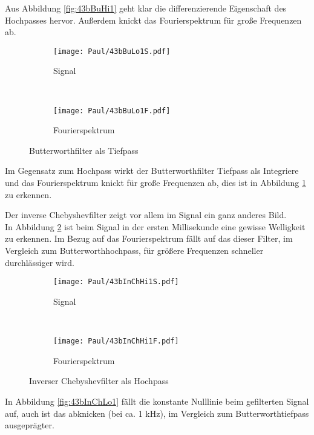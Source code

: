 Aus Abbildung \ref{fig:43bBuHi1} geht klar die differenzierende Eigenschaft des Hochpasses hervor. Außerdem knickt das Fourierspektrum für große Frequenzen ab.\\

\begin{figure}[h]
    \centering
    \begin{subfigure}{0.9\textwidth}
        \centering
        \texttt{[image: Paul/43bBuLo1S.pdf]}
        \caption{Signal}
    \end{subfigure}
    \\
    \begin{subfigure}{0.9\textwidth}
        \centering
        \texttt{[image: Paul/43bBuLo1F.pdf]}
        \caption{Fourierspektrum}
    \end{subfigure}
    \caption{Butterworthfilter als Tiefpass}
    \label{fig:43BuLo1}
\end{figure}

Im Gegensatz zum Hochpass wirkt der Butterworthfilter Tiefpass als Integriere und das Fourierspektrum knickt für große Frequenzen ab, dies ist in Abbildung \ref{fig:43BuLo1} zu erkennen.


\newpage
Der inverse Chebyshevfilter zeigt vor allem im Signal ein ganz anderes Bild.\\
In Abbildung \ref{fig:43bInChHi1} ist beim Signal in der ersten Millisekunde eine gewisse Welligkeit zu erkennen. Im Bezug auf das Fourierspektrum fällt auf das dieser Filter, im Vergleich zum Butterworthhochpass, für größere Frequenzen schneller durchlässiger wird.
\begin{figure}[h]
    \centering
    \begin{subfigure}{0.9\textwidth}
        \centering
        \texttt{[image: Paul/43bInChHi1S.pdf]}
        \caption{Signal}
    \end{subfigure}
    \\
    \begin{subfigure}{0.9\textwidth}
        \centering
        \texttt{[image: Paul/43bInChHi1F.pdf]}
        \caption{Fourierspektrum}
    \end{subfigure}
    \caption{Inverser Chebyshevfilter als Hochpass}
    \label{fig:43bInChHi1}
\end{figure}

\newpage
In Abbildung \ref{fig:43bInChLo1} fällt die konstante Nulllinie beim gefilterten Signal auf, auch ist das abknicken (bei ca. 1 kHz), im Vergleich zum Butterworthtiefpass ausgeprägter.\\

